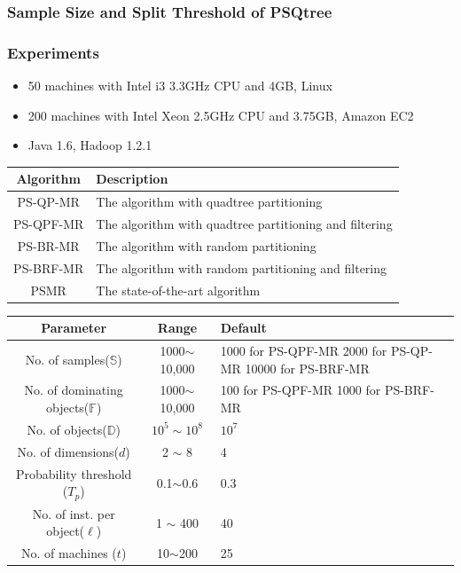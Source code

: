 \documentclass{beamer}
\begin{document}
\begin{frame}%
\frametitle{Sample Size and Split Threshold of PSQtree}
\end{frame}

\begin{frame} %
\frametitle{Experiments}
\begin{itemize}
\item 50 machines with Intel i3 3.3GHz CPU and 4GB, Linux
\item 200 machines with Intel Xeon 2.5GHz CPU and 3.75GB, Amazon EC2
\item Java 1.6, Hadoop 1.2.1
\end{itemize}
\begin{table}[htbp]
\scriptsize
\begin{tabular}{|c|l|}
\hline Algorithm& Description  \\
\hline
PS-QP-MR&The algorithm with quadtree partitioning\\
\hline
PS-QPF-MR&The algorithm with quadtree partitioning and filtering\\
\hline
PS-BR-MR&The algorithm with random partitioning \\
\hline
PS-BRF-MR&The algorithm with random partitioning and filtering\\
\hline
PSMR& The state-of-the-art algorithm \\
\hline
\end{tabular}
\end{table}
\begin{table}[htbp]
\scriptsize
\begin{tabular}{|c|c|p{3cm}|}
\hline Parameter& Range &  Default \\
\hline
No. of samples($\mathbb{S}$)&1000$\sim$10,000 &1000 for PS-QPF-MR 2000 for PS-QP-MR 10000 for PS-BRF-MR \\
\hline
No. of dominating objects($\mathbb{F}$) &1000$\sim$10,000 &100 for PS-QPF-MR 1000 for PS-BRF-MR \\
\hline
No. of objects($\mathbb{D}$)&$10^5\sim10^8$ & $10^7$ \\
\hline
No. of dimensions($d$)&2 $\sim$ 8 &4\\
\hline 
Probability threshold ($T_p$) & 0.1$\sim$0.6 &0.3 \\
\hline
No. of inst. per object($\ell$)&1 $\sim$ 400 &40 \\
\hline
No. of machines ($t$) &10$\sim$200 &25\\
\hline
\end{tabular}
\end{table}

\end{frame}
\end{document}
